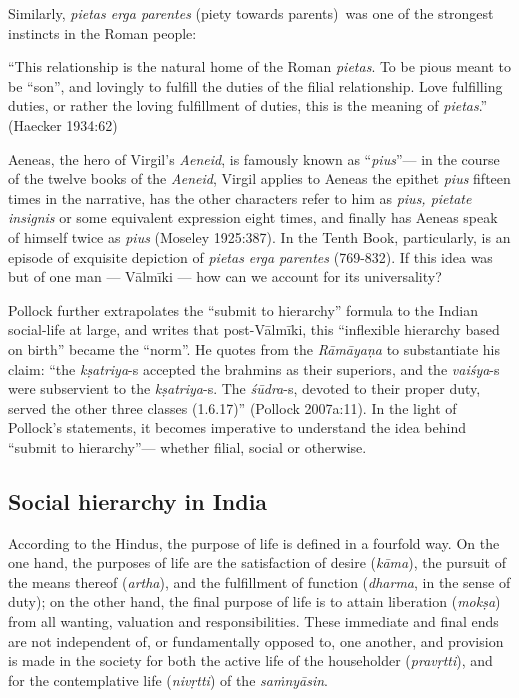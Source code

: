 Similarly, {\sl pietas erga parentes} (piety towards parents) was one of the strongest instincts in the Roman people: 

\begin{myquote}
“This relationship is the natural home of the Roman {\sl pietas}. To be pious meant to be “son”, and lovingly to fulfill the duties of the filial relationship. Love fulfilling duties, or rather the loving fulfillment of duties, this is the meaning of {\sl pietas}.”
\hfill (Haecker 1934:62)
\end{myquote}

\newpage

Aeneas, the hero of Virgil’s {\sl Aeneid}, is famously known as “{\sl pius}”--- in the course of the twelve books of the {\sl Aeneid}, Virgil applies to Aeneas the epithet {\sl pius} fifteen times in the narrative, has the other characters refer to him as {\sl pius, pietate insignis} or some equivalent expression eight times, and finally has Aeneas speak of himself twice as {\sl pius} (Moseley 1925:387). In the Tenth Book, particularly, is an episode of exquisite depiction of {\sl pietas erga parentes} (769-832). If this idea was but of one man --- Vālmīki --- how can we account for its universality? 

Pollock further extrapolates the “submit to hierarchy” formula to the Indian social-life at large, and writes that post-Vālmīki, this “inflexible hierarchy based on birth” became the “norm”. He quotes from the {\sl Rāmāyaṇa} to substantiate his claim: “the {\sl kṣatriya}-s accepted the brahmins as their superiors, and the {\sl vaiśya}-s were subservient to the {\sl kṣatriya}-s. The {\sl śūdra}-s, devoted to their proper duty, served the other three classes (1.6.17)'' (Pollock 2007a:11). In the light of Pollock’s statements, it becomes imperative to understand the idea behind “submit to hierarchy”— whether filial, social or otherwise.\\[-20pt] 

\subsection[Social hierarchy in India]{Social hierarchy in India}\label{sec1.3.1}

According to the Hindus, the purpose of life is defined in a fourfold way. On the one hand, the purposes of life are the satisfaction of desire ({\sl kāma}), the pursuit of the means thereof ({\sl artha}), and the fulfillment of function ({\sl dharma}, in the sense of duty); on the other hand, the final purpose of life is to attain liberation ({\sl mokṣa}) from all wanting, valuation and responsibilities. These immediate and final ends are not independent of, or fundamentally opposed to, one another, and provision is made in the society for both the active life of the householder ({\sl pravṛtti}), and for the contemplative life ({\sl nivṛtti}) of the {\sl saṁnyāsin}.  

